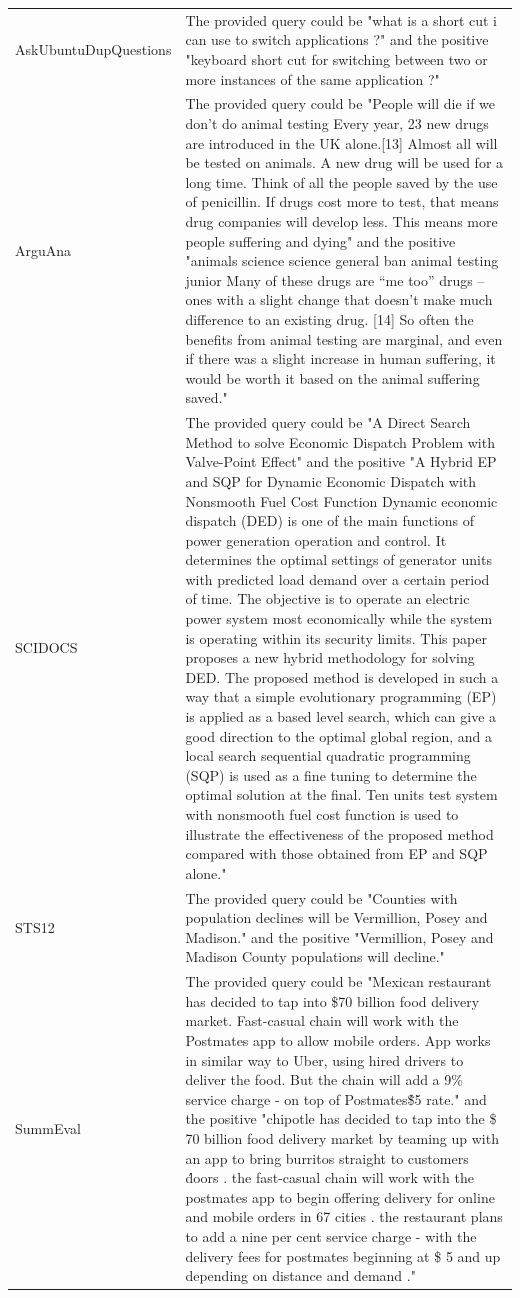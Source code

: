 \documentclass{article}
\begin{document}
\begin{longtable}{lp{9cm}}
\midrule
AskUbuntuDupQuestions & The provided query could be "what is a short cut i can use to switch applications ?" and the positive "keyboard short cut for switching between two or more instances of the same application ?" \\
ArguAna & The provided query could be "People will die if we don’t do animal testing Every year, 23 new drugs are introduced in the UK alone.[13] Almost all will be tested on animals. A new drug will be used for a long time. Think of all the people saved by the use of penicillin. If drugs cost more to test, that means drug companies will develop less. This means more people suffering and dying" and the positive "animals science science general ban animal testing junior Many of these drugs are “me too” drugs – ones with a slight change that doesn’t make much difference to an existing drug. [14] So often the benefits from animal testing are marginal, and even if there was a slight increase in human suffering, it would be worth it based on the animal suffering saved." \\
SCIDOCS & The provided query could be "A Direct Search Method to solve Economic Dispatch Problem with Valve-Point Effect" and the positive "A Hybrid EP and SQP for Dynamic Economic Dispatch with Nonsmooth Fuel Cost Function Dynamic economic dispatch (DED) is one of the main functions of power generation operation and control. It determines the optimal settings of generator units with predicted load demand over a certain period of time. The objective is to operate an electric power system most economically while the system is operating within its security limits. This paper proposes a new hybrid methodology for solving DED. The proposed method is developed in such a way that a simple evolutionary programming (EP) is applied as a based level search, which can give a good direction to the optimal global region, and a local search sequential quadratic programming (SQP) is used as a fine tuning to determine the optimal solution at the final. Ten units test system with nonsmooth fuel cost function is used to illustrate the effectiveness of the proposed method compared with those obtained from EP and SQP alone." \\
\midrule
STS12 & The provided query could be "Counties with population declines will be Vermillion, Posey and Madison." and the positive "Vermillion, Posey and Madison County populations will decline." \\
\midrule
SummEval & The provided query could be "Mexican restaurant has decided to tap into \$70 billion food delivery market. Fast-casual chain will work with the Postmates app to allow mobile orders. App works in similar way to Uber, using hired drivers to deliver the food. But the chain will add a 9\% service charge - on top of Postmates\' \$5 rate." and the positive "chipotle has decided to tap into the \$ 70 billion food delivery market by teaming up with an app to bring burritos straight to customers \' doors . the fast-casual chain will work with the postmates app to begin offering delivery for online and mobile orders in 67 cities . the restaurant plans to add a nine per cent service charge - with the delivery fees for postmates beginning at \$ 5 and up depending on distance and demand ." \\

\end{longtable}
\end{document}

